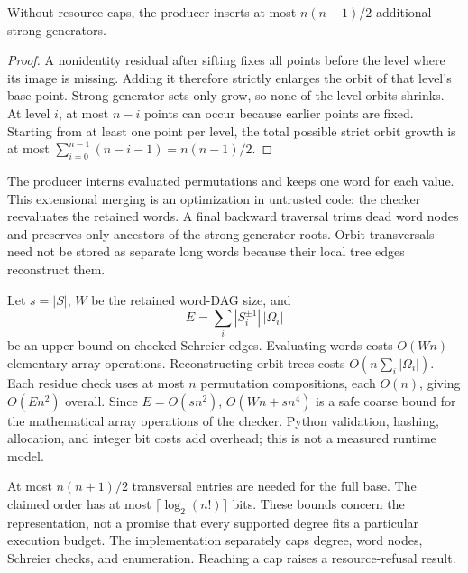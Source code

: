 \begin{proposition}
Without resource caps, the producer inserts at most $n(n-1)/2$ additional strong generators.
\end{proposition}
\begin{proof}
A nonidentity residual after sifting fixes all points before the level where its image is missing. Adding it therefore strictly enlarges the orbit of that level's base point. Strong-generator sets only grow, so none of the level orbits shrinks. At level $i$, at most $n-i$ points can occur because earlier points are fixed. Starting from at least one point per level, the total possible strict orbit growth is at most
$\sum_{i=0}^{n-1}(n-i-1)=n(n-1)/2$.
\end{proof}

The producer interns evaluated permutations and keeps one word for each value. This extensional merging is an optimization in untrusted code: the checker reevaluates the retained words. A final backward traversal trims dead word nodes and preserves only ancestors of the strong-generator roots. Orbit transversals need not be stored as separate long words because their local tree edges reconstruct them.

Let $s=|S|$, $W$ be the retained word-DAG size, and
\[
 E=\sum_i |S_i^{\pm1}|\,|\Omega_i|
\]
be an upper bound on checked Schreier edges. Evaluating words costs $O(Wn)$ elementary array operations. Reconstructing orbit trees costs $O(n\sum_i|\Omega_i|)$. Each residue check uses at most $n$ permutation compositions, each $O(n)$, giving $O(En^2)$ overall. Since $E=O(sn^2)$, $O(Wn+sn^4)$ is a safe coarse bound for the mathematical array operations of the checker. Python validation, hashing, allocation, and integer bit costs add overhead; this is not a measured runtime model.

At most $n(n+1)/2$ transversal entries are needed for the full base. The claimed order has at most $\lceil\log_2(n!)\rceil$ bits. These bounds concern the representation, not a promise that every supported degree fits a particular execution budget. The implementation separately caps degree, word nodes, Schreier checks, and enumeration. Reaching a cap raises a resource-refusal result.
